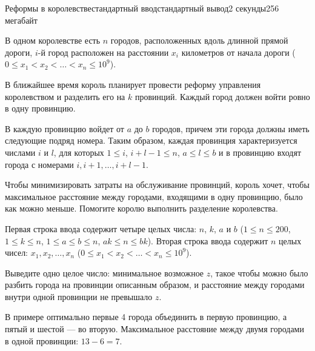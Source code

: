 \begin{problem}{Реформы в королевстве}{стандартный ввод}{стандартный вывод}{2 секунды}{256 мегабайт}

В одном королевстве есть $n$ городов, расположенных вдоль длинной прямой дороги, $i$-й город
расположен на расстоянии $x_i$ километров от начала дороги ($0 \le x_1 < x_2 < \ldots < x_n \le 10^9$). 

В ближайшее время король планирует
провести реформу управления королевством и разделить его на $k$ провинций. 
Каждый город должен войти ровно в одну провинцию.

В каждую провинцию войдет от $a$ до $b$ городов, причем эти города должны иметь следующие 
подряд номера. Таким образом, каждая провинция характеризуется числами $i$ и $l$, 
для которых $1 \le i$, $i + l - 1 \le n$, $a \le l \le b$ и в провинцию входят
города с номерами $i, i + 1, \ldots, i + l - 1$. 

Чтобы минимизировать затраты на обслуживание провинций, король хочет, чтобы максимальное расстояние
между городами, входящими в одну провинцию, было как можно меньше. Помогите королю выполнить
разделение королевства.


\InputFile
Первая строка ввода содержит четыре целых числа: $n$, $k$, $a$ и $b$ ($1 \le n \le 200$, $1 \le k \le n$,
$1 \le a \le b \le n$, $ak \le n \le bk$).
Вторая строка ввода содержит $n$ целых чисел: $x_1, x_2, \ldots, x_n$ ($0 \le x_1 < x_2 < \ldots < x_n \le 10^9$). 

\OutputFile
Выведите одно целое число: минимальное возможное $z$, такое чтобы можно было разбить города на провинции
описанным образом, и расстояние между городами внутри одной провинции не превышало $z$.

\Example

\begin{example}%
%
\end{example}

\Explanation

В примере оптимально первые 4 города объединить в первую провинцию, а пятый и шестой --- во вторую.
Максимальное расстояние между двумя городами в одной провинции: $13 - 6 = 7$.

\end{problem}
